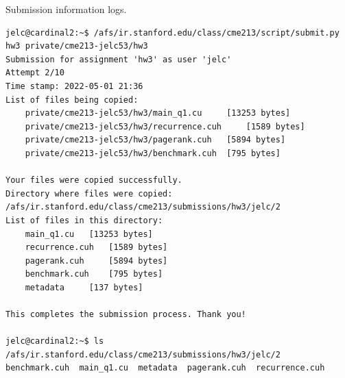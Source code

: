 \documentclass[12pt,letterpaper,twoside]{article}
\begin{document}
Submission information logs.
\begin{verbatim}
jelc@cardinal2:~$ /afs/ir.stanford.edu/class/cme213/script/submit.py hw3 private/cme213-jelc53/hw3
Submission for assignment 'hw3' as user 'jelc'
Attempt 2/10
Time stamp: 2022-05-01 21:36
List of files being copied:
    private/cme213-jelc53/hw3/main_q1.cu	 [13253 bytes]
    private/cme213-jelc53/hw3/recurrence.cuh	 [1589 bytes]
    private/cme213-jelc53/hw3/pagerank.cuh	 [5894 bytes]
    private/cme213-jelc53/hw3/benchmark.cuh	 [795 bytes]

Your files were copied successfully.
Directory where files were copied: /afs/ir.stanford.edu/class/cme213/submissions/hw3/jelc/2
List of files in this directory:
    main_q1.cu	 [13253 bytes]
    recurrence.cuh	 [1589 bytes]
    pagerank.cuh	 [5894 bytes]
    benchmark.cuh	 [795 bytes]
    metadata	 [137 bytes]

This completes the submission process. Thank you!
    
jelc@cardinal2:~$ ls /afs/ir.stanford.edu/class/cme213/submissions/hw3/jelc/2
benchmark.cuh  main_q1.cu  metadata  pagerank.cuh  recurrence.cuh
\end{verbatim}
\end{document}
